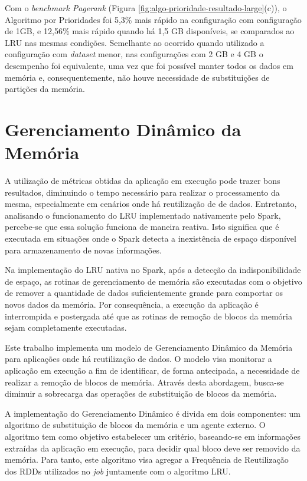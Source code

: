 Com o \textit{benchmark Pagerank} (Figura \ref{fig:algo-prioridade-resultado-large}(c)), o Algoritmo por Prioridades foi 5,3\% mais rápido na configuração com configuração de 1GB, e 12,56\% mais rápido quando há 1,5 GB disponíveis, se comparados ao LRU nas mesmas condições. Semelhante ao ocorrido quando utilizado a configuração com \textit{dataset} menor, nas configurações com 2 GB e 4 GB o desempenho foi equivalente, uma  vez que foi possível manter todos os dados em memória e, consequentemente, não houve necessidade de substituições de partições da memória.


\section{Gerenciamento Dinâmico da Memória} \label{sec:gerenc-dinamico}
A utilização de métricas obtidas da aplicação em execução pode trazer bons resultados, diminuindo o tempo necessário para realizar o processamento da mesma, especialmente em cenários onde há reutilização de de dados. Entretanto, analisando o funcionamento do LRU implementado nativamente pelo Spark, percebe-se que essa solução funciona de maneira reativa. Isto significa que é executada em situações onde o Spark detecta a inexistência de espaço disponível para armazenamento de novas informações. 

Na implementação do LRU nativa no Spark, após a detecção da indisponibilidade de espaço, as rotinas de gerenciamento de memória são executadas com o objetivo de remover a quantidade de dados suficientemente grande para comportar os novos dados da memória. Por consequência, a execução da aplicação é interrompida e postergada até que as rotinas de remoção de blocos da memória sejam completamente executadas.

Este trabalho implementa um modelo de Gerenciamento Dinâmico da Memória para aplicações onde há reutilização de dados. O modelo visa monitorar a aplicação em execução a fim de identificar, de forma antecipada, a necessidade de realizar a remoção de blocos de memória. Através desta abordagem, busca-se diminuir a sobrecarga das operações de substituição de blocos da memória.

A implementação do Gerenciamento Dinâmico é divida em dois componentes: um algoritmo de substituição de blocos da memória e um agente externo. O algoritmo tem como objetivo estabelecer um critério, baseando-se em informações extraídas da aplicação em execução, para decidir qual bloco deve ser removido da memória. Para tanto, este algoritmo visa agregar a Frequência de Reutilização dos RDDs utilizados no \textit{job} juntamente com o algoritmo LRU.

